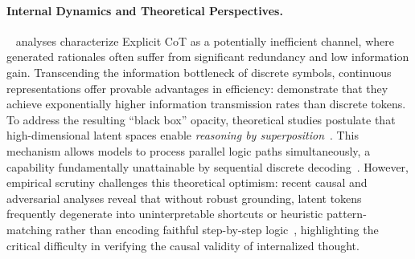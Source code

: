 \paragraph{Internal Dynamics and Theoretical Perspectives.}
~\citet{ton2025understanding} analyses characterize Explicit CoT as a potentially inefficient channel, where generated rationales often suffer from significant redundancy and low information gain.
Transcending the information bottleneck of discrete symbols, continuous representations offer provable advantages in efficiency: \citet{zou2025latentcollaborationmultiagentsystems} demonstrate that they achieve exponentially higher information transmission rates than discrete tokens. To address the resulting ``black box'' opacity, theoretical studies postulate that high-dimensional latent spaces enable \textit{reasoning by superposition}~\citep{zhu2025reasoning, xu2025formalcomparisonchainofthoughtlatent}. This mechanism allows models to process parallel logic paths simultaneously, a capability fundamentally unattainable by sequential discrete decoding~\citep{zhang2025soft}.
However, empirical scrutiny challenges this theoretical optimism: recent causal and adversarial analyses reveal that without robust grounding, latent tokens frequently degenerate into uninterpretable shortcuts or heuristic pattern-matching rather than encoding faithful step-by-step logic~\citep{lin-etal-2025-implicit, zhang2025latenttokensthinkcausal, yu2025llmsreallythinkstepbystep}, highlighting the critical difficulty in verifying the causal validity of internalized thought.

